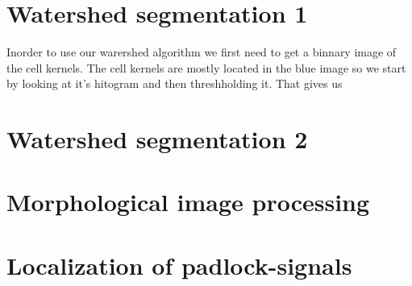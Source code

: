 \documentclass[10pt,twocolumn]{article}
\begin{document}
\section{Watershed segmentation 1}
Inorder to use our warershed algorithm we first need to get a binnary image of the cell kernels. The cell kernels are mostly located
in the blue image so we start by looking at it's hitogram and then threshholding it. That gives us

\section{Watershed segmentation 2}

\section{Morphological image processing}

\section{Localization of padlock-signals}
\end{document}

